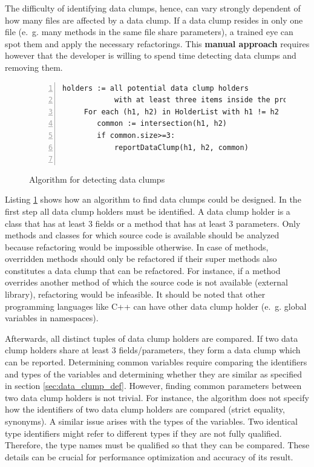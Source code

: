 The difficulty of identifying data clumps, hence, can vary strongly dependent of how many files are affected by a data clump. If a data clump resides in only one file (e.~g. many methods in the same file share parameters), a trained eye can spot them and apply the necessary refactorings. This \textbf{manual approach} requires however that the developer is willing to spend time detecting data clumps and removing them. 


\begin{figure}[ht!]
\begin{lstlisting}[numbers=left]
    holders := all potential data clump holders 
            with at least three items inside the project
     For each (h1, h2) in HolderList with h1 != h2
        common := intersection(h1, h2)
        if common.size>=3:
            reportDataClump(h1, h2, common)
        

\end{lstlisting}
\caption{Algorithm for detecting data clumps}
\label{lst:data_clumps_algo}
\end{figure}






Listing \ref{lst:data_clumps_algo} shows how an algorithm to find data clumps could be designed. In the first step all data clump holders must be identified.
A data clump holder is a class that has at least 3 fields or a method that has at least 3 parameters.  Only methods and classes for which source code is available should be analyzed because refactoring would be impossible otherwise. In case of methods, overridden methods should only be refactored if their super methods also constitutes a data clump that can be refactored.  For instance, if a method overrides another method of which the source code is not available (external library), refactoring would be infeasible. 
It should be noted that other programming languages like C++ can have other data clump holder (e.~g. global variables in namespaces). 


Afterwards, all distinct tuples of data clump holders are compared. If two data clump holders share at least 3 fields/parameters, they form a data clump which can be reported. Determining common variables require comparing the identifiers and types of the variables and determining whether they are similar as specified in section \ref{sec:data_clump_def}. However, finding common parameters between two data clump holders is not trivial.  For instance, the algorithm does not specify how the identifiers of two data clump holders are compared (strict equality, synonyms). A similar issue arises with the types of the variables.  Two identical type identifiers might refer to different types if they are not fully qualified. Therefore, the type names must be qualified so that they can be compared. These details can be crucial for performance optimization and accuracy of its result. 



